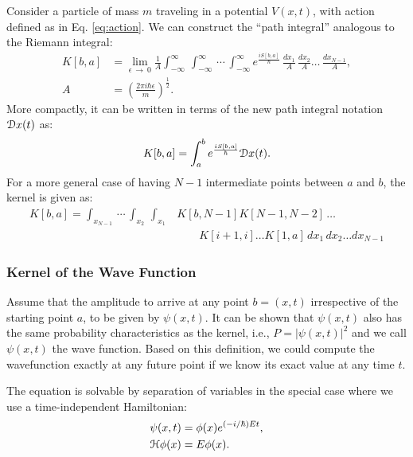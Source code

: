         Consider a particle of mass $m$ traveling in a potential $V(x,t)$, with action defined as in Eq. \eqref{eq:action}. We can construct the ``path integral'' analogous to the Riemann integral:
        \begin{equation}
            \begin{aligned}
                K[b,a] &= \displaystyle\lim_{\epsilon\,\to\ 0} \frac{1}{A}\int_{-\infty}^\infty\,\int_{-\infty}^\infty\,\cdots\,\int_{-\infty}^\infty e^{\frac{iS[b,a]}{\hbar}}\,\frac{dx_1}{A}\,\frac{dx_2}{A}\ldots\,\frac{dx_{N-1}}{A},\\
                A &= {\left( \displaystyle\frac{2\pi i \hbar \epsilon}{m} \right)}^{\frac{1}{2}}.
            \end{aligned}
        \end{equation}
        More compactly, it can be written in terms of the new path integral notation $\mathcal{D} x(t)$ as:
        \begin{equation}
        \label{eq:PI compact kernel}
            K[b,a] = \displaystyle \int_{a}^b e^{\frac{iS[b,a]}{\hbar}} \mathcal{D} x(t).
        \end{equation}
        For a more general case of having $N-1$ intermediate points between $a$ and $b$, the kernel is given as:
        \begin{equation}
            \begin{aligned}
                K[b,a] = \int_{x_{N-1}}\,\cdots\,\int_{x_2}\,\int_{x_1} &K[b,N-1]K[N-1,N-2]\,\ldots\\
                & \qquad K[i+1,i] \ldots K[1,a]\,dx_1\,dx_2\ldots dx_{N-1}
            \end{aligned}
        \end{equation}
        
        \subsubsection{Kernel of the Wave Function}
            Assume that the amplitude to arrive at any point $b = (x,t)$ irrespective of the starting point $a$, to be given by $\psi (x,t)$. It can be shown that $\psi (x,t)$ also has the same probability characteristics as the kernel, i.e., $P = |\psi (x,t)|^2$ and we call $\psi (x,t)$ the wave function. Based on this definition, we could compute the wavefunction exactly at any future point if we know its exact value at any time $t$.

            The \Schrodinger{} equation is solvable by separation of variables in the special case where we use a time-independent Hamiltonian:
            \begin{equation}
                \label{eq:psi}
                \begin{aligned}
                    \psi(x,t) &= \phi(x)e^{(-i/\hbar)Et},\\
                    \mathcal{H} \phi(x) &= E \phi(x).
                \end{aligned}
            \end{equation}

